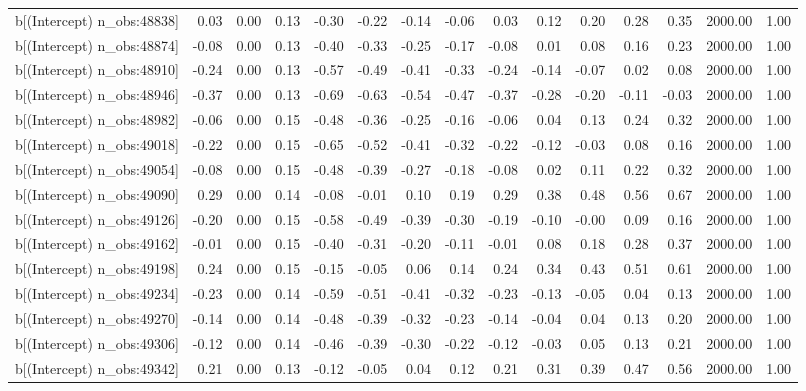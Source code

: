 \begin{table}[ht]
\begin{tabular}{rrrrrrrrrrrrrrr}
  b[(Intercept) n\_obs:48838] & 0.03 & 0.00 & 0.13 & -0.30 & -0.22 & -0.14 & -0.06 & 0.03 & 0.12 & 0.20 & 0.28 & 0.35 & 2000.00 & 1.00 \\ 
  b[(Intercept) n\_obs:48874] & -0.08 & 0.00 & 0.13 & -0.40 & -0.33 & -0.25 & -0.17 & -0.08 & 0.01 & 0.08 & 0.16 & 0.23 & 2000.00 & 1.00 \\ 
  b[(Intercept) n\_obs:48910] & -0.24 & 0.00 & 0.13 & -0.57 & -0.49 & -0.41 & -0.33 & -0.24 & -0.14 & -0.07 & 0.02 & 0.08 & 2000.00 & 1.00 \\ 
  b[(Intercept) n\_obs:48946] & -0.37 & 0.00 & 0.13 & -0.69 & -0.63 & -0.54 & -0.47 & -0.37 & -0.28 & -0.20 & -0.11 & -0.03 & 2000.00 & 1.00 \\ 
  b[(Intercept) n\_obs:48982] & -0.06 & 0.00 & 0.15 & -0.48 & -0.36 & -0.25 & -0.16 & -0.06 & 0.04 & 0.13 & 0.24 & 0.32 & 2000.00 & 1.00 \\ 
  b[(Intercept) n\_obs:49018] & -0.22 & 0.00 & 0.15 & -0.65 & -0.52 & -0.41 & -0.32 & -0.22 & -0.12 & -0.03 & 0.08 & 0.16 & 2000.00 & 1.00 \\ 
  b[(Intercept) n\_obs:49054] & -0.08 & 0.00 & 0.15 & -0.48 & -0.39 & -0.27 & -0.18 & -0.08 & 0.02 & 0.11 & 0.22 & 0.32 & 2000.00 & 1.00 \\ 
  b[(Intercept) n\_obs:49090] & 0.29 & 0.00 & 0.14 & -0.08 & -0.01 & 0.10 & 0.19 & 0.29 & 0.38 & 0.48 & 0.56 & 0.67 & 2000.00 & 1.00 \\ 
  b[(Intercept) n\_obs:49126] & -0.20 & 0.00 & 0.15 & -0.58 & -0.49 & -0.39 & -0.30 & -0.19 & -0.10 & -0.00 & 0.09 & 0.16 & 2000.00 & 1.00 \\ 
  b[(Intercept) n\_obs:49162] & -0.01 & 0.00 & 0.15 & -0.40 & -0.31 & -0.20 & -0.11 & -0.01 & 0.08 & 0.18 & 0.28 & 0.37 & 2000.00 & 1.00 \\ 
  b[(Intercept) n\_obs:49198] & 0.24 & 0.00 & 0.15 & -0.15 & -0.05 & 0.06 & 0.14 & 0.24 & 0.34 & 0.43 & 0.51 & 0.61 & 2000.00 & 1.00 \\ 
  b[(Intercept) n\_obs:49234] & -0.23 & 0.00 & 0.14 & -0.59 & -0.51 & -0.41 & -0.32 & -0.23 & -0.13 & -0.05 & 0.04 & 0.13 & 2000.00 & 1.00 \\ 
  b[(Intercept) n\_obs:49270] & -0.14 & 0.00 & 0.14 & -0.48 & -0.39 & -0.32 & -0.23 & -0.14 & -0.04 & 0.04 & 0.13 & 0.20 & 2000.00 & 1.00 \\ 
  b[(Intercept) n\_obs:49306] & -0.12 & 0.00 & 0.14 & -0.46 & -0.39 & -0.30 & -0.22 & -0.12 & -0.03 & 0.05 & 0.13 & 0.21 & 2000.00 & 1.00 \\ 
  b[(Intercept) n\_obs:49342] & 0.21 & 0.00 & 0.13 & -0.12 & -0.05 & 0.04 & 0.12 & 0.21 & 0.31 & 0.39 & 0.47 & 0.56 & 2000.00 & 1.00 \\ 

\end{tabular}
\end{table}
